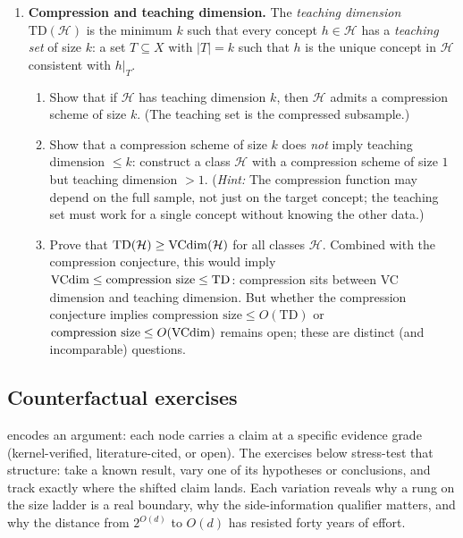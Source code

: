 \begin{enumerate}[leftmargin=*,itemsep=6pt]
\item \textbf{Compression and teaching dimension.}
  The \emph{teaching dimension} $\mathrm{TD}(\mathcal{H})$ is the
  minimum $k$ such that every concept $h \in \mathcal{H}$ has a
  \emph{teaching set} of size $k$: a set $T \subseteq X$ with
  $|T| = k$ such that $h$ is the unique concept in $\mathcal{H}$
  consistent with $h|_T$.
  \begin{enumerate}[label=(\alph*)]
  \item Show that if $\mathcal{H}$ has teaching dimension $k$, then
    $\mathcal{H}$ admits a compression scheme of size $k$.  (The
    teaching set is the compressed subsample.)
  \item Show that a compression scheme of size $k$ does \emph{not}
    imply teaching dimension $\leq k$: construct a class $\mathcal{H}$
    with a compression scheme of size $1$ but teaching dimension
    $> 1$.  (\emph{Hint:} The compression function may depend on the
    full sample, not just on the target concept; the teaching set must
    work for a single concept without knowing the other data.)
  \item Prove that $\mathrm{TD}(\mathcal{H}) \geq \mathrm{VCdim}(\mathcal{H})$
    for all classes $\mathcal{H}$.  Combined with the compression
    conjecture, this would imply
    $\mathrm{VCdim} \leq \text{compression size} \leq \mathrm{TD}$: compression
    sits between VC dimension and teaching dimension.  But whether
    the compression conjecture implies
    $\text{compression size} \leq O(\mathrm{TD})$ or
    $\text{compression size} \leq O(\mathrm{VCdim})$ remains open; these are
    distinct (and incomparable) questions.
  \end{enumerate}

\end{enumerate}

\subsection*{Counterfactual exercises}

 encodes an argument: each node carries a claim
at a specific evidence grade (kernel-verified, literature-cited, or open).  The exercises below stress-test that structure: take a known result,
vary one of its hypotheses or conclusions, and track exactly where the shifted
claim lands.  Each variation reveals why a rung on the size ladder is a real
boundary, why the side-information qualifier matters, and why the distance from
$2^{O(d)}$ to $O(d)$ has resisted forty years of effort.

